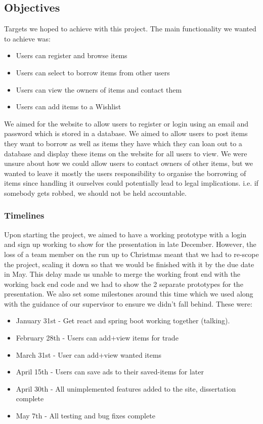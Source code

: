 \subsection{Objectives}
Targets we hoped to achieve with this project. The main functionality we wanted to achieve was:
\begin{itemize}
    \item Users can register and browse items

    \item Users can select to borrow items from other users

    \item Users can view the owners of items and contact them

    \item Users can add items to a Wishlist
\end{itemize}
We aimed for the website to allow users to register or login using an email and password which is stored in a database. We aimed to allow users to post items they want to borrow as well as items they have which they can loan out to a database and display these items on the website for all users to view. We were unsure about how we could allow users to contact owners of other items, but we wanted to leave it mostly the users responsibility to organise the borrowing of items since handling it ourselves could potentially lead to legal implications. i.e. if somebody gets robbed, we should not be held accountable.

\subsubsection{Timelines}
Upon starting the project, we aimed to have a working prototype with a login and sign up working to show for the presentation in late December. However, the loss of a team member on the run up to Christmas meant that we had to re-scope the project, scaling it down so that we would be finished with it by the due date in May. This delay made us unable to merge the working front end with the working back end code and we had to show the 2 separate prototypes for the presentation.
We also set some milestones around this time which we used along with the guidance of our supervisor to ensure we didn't fall behind. These were:
\begin{itemize}
    \item January 31st - Get react and spring boot working together (talking).

    \item February 28th - Users can add+view items for trade

    \item March 31st - User can add+view wanted items

    \item April 15th - Users can save ads to their saved-items for later
    
    \item April 30th - All unimplemented features added to the site, dissertation complete
    
    \item May 7th - All testing and bug fixes complete
\end{itemize}

